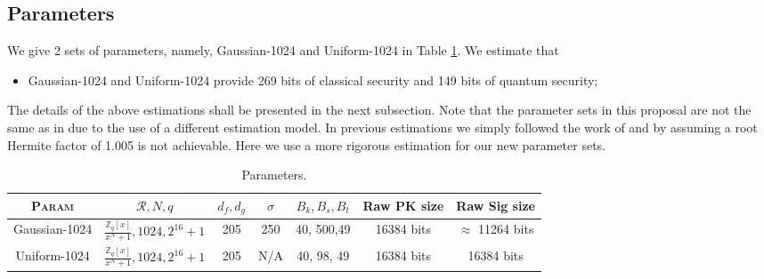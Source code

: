 \documentclass{llncs}
\newcommand{\Rcal}{{\mathcal R}}
\newcommand{\ZZ}{\mathbb{Z}}
\newcommand{\<}{\langle}
\renewcommand{\>}{\rangle}
\begin{document}
\subsection{Parameters}
We give 2 sets of parameters, namely, \textsf{Gaussian-1024} and \textsf{Uniform-1024}  in Table \ref{tab:param}.
We estimate that 
\begin{itemize}
\item \textsf{Gaussian-1024} and \textsf{Uniform-1024} provide 269 bits of classical security
and 149 bits of quantum security;
\end{itemize}
The details of the above estimations shall be presented in the next subsection.
Note that the parameter sets in this proposal are not
the same as in \cite{DBLP:conf/pqcrypto/HoffsteinPSSW14,cryptoeprint:2017:995} due to the 
use of a different estimation model. In previous
estimations we simply followed the work of \cite{BKZ2}
and \cite{DBLP:conf/crypto/DucasDLL13} by assuming 
a root Hermite factor of 1.005 is not achievable.
Here we use a more rigorous estimation for our new
parameter sets.

\begin{table}\centering
\caption{Parameters.}\label{tab:param}
\begin{tabular}{|c|c|c|c|c|c|c|}\hline
\textsc{Param}&$\Rcal, N, q$ & $d_f, d_g$ & $\sigma$ & $B_k, B_s, B_t$ & Raw PK size & Raw Sig size\\\hline
\textsf{Gaussian-1024}&$\frac{\ZZ_q[x]}{x^N+1}, 1024, 2^{16}+1$ & 205 & 250 & 40, 500,49 & 16384 bits & $\approx$ 11264 bits \\

\textsf{Uniform-1024}&$\frac{\ZZ_q[x]}{x^N+1}, 1024, 2^{16}+1$ & 205 & N/A & 40, 98, 49 &16384 bits & 16384 bits 

\\\hline
\end{tabular} 


\end{table}
\end{document}
